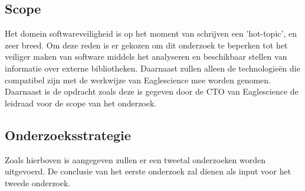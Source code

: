 \subsection{Scope}\label{subsec:scope}
Het domein softwareveiligheid is op het moment van schrijven een 'hot-topic', en zeer breed. Om deze reden is er gekozen om dit onderzoek te beperken tot het veiliger maken van software middels het analyseren en beschikbaar stellen van informatie over externe bibliotheken. Daarnaast zullen alleen de technologieën die compatibel zijn met de werkwijze van Eaglescience mee worden genomen. Daarnaast is de opdracht zoals deze is gegeven door de CTO van Eaglescience de leidraad voor de scope van het onderzoek.

\subsection{Onderzoeksstrategie}\label{subsec:onderzoek-strategie}
Zoals hierboven is aangegeven zullen er een tweetal onderzoeken worden uitgevoerd. De conclusie van het eerste onderzoek zal dienen als input voor het tweede onderzoek.



